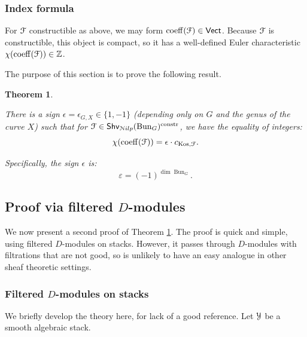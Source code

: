 \documentclass[reqno,11pt]{amsart}
\numberwithin{equation}{subsection}
\newtheorem{thm}{Theorem}[subsubsection]
\theoremstyle{remark}
\newcommand{\eps}{\epsilon}
\newcommand{\bZ}{{\mathbb Z}}
\newcommand{\sF}{{\EuScript F}}
\newcommand{\sN}{{\EuScript N}}
\newcommand{\sY}{{\EuScript Y}}
\newcommand{\on}{\operatorname}
\newcommand{\vareps}{\varepsilon}
\newcommand{\Vect}{\mathsf{Vect}}
\newcommand{\Bun}{\on{Bun}}
\newcommand{\coeff}{\on{coeff}}
\newcommand{\Shv}{\mathsf{Shv}}
\newcommand{\Nilp}{\sN ilp}
\newcommand{\Kos}{\on{Kos}}
\begin{document}
\subsubsection{Index formula}

For $\sF$ constructible as above, we may form $\coeff(\sF) \in \Vect$. Because
$\sF$ is constructible, this object is compact, so it has
a well-defined Euler characteristic $\chi(\coeff(\sF)) \in \bZ$.

The purpose of this section is to prove the following result.

\begin{thm}\label{t:index}

There is a sign $\eps = \eps_{G,X} \in \{1,-1\}$ (depending only on $G$ and 
the genus of the curve $X$) such that for 
$\sF \in \Shv_{\Nilp}(\Bun_G)^{\on{constr}}$, we have the equality of integers:
%
\[
\chi(\coeff(\sF)) = \eps \cdot c_{\Kos,\sF}. 
\]

Specifically, the sign $\eps$ is:
%
\[
\vareps = (-1)^{\dim \Bun_G}.
\]

\end{thm}

\subsection{Proof via filtered $D$-modules}

We now present a second proof of Theorem \ref{t:index}.
The proof is quick and simple, using filtered $D$-modules on stacks.
However, it passes through $D$-modules with filtrations that
are not good, so is unlikely to have an easy analogue in 
other sheaf theoretic settings.

\subsubsection{Filtered $D$-modules on stacks}

We briefly develop the theory here, for lack of a good reference.
Let $\sY$ be a smooth algebraic stack.
\end{document}
